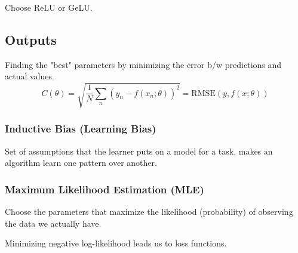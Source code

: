 \begin{warning}
    Choose ReLU or GeLU.
\end{warning}

\subsection{Outputs}
\begin{definition}
    Finding the "best" parameters by minimizing the error b/w predictions and actual values. 
    \begin{equation*}
        C(\theta) = \sqrt{\frac{1}{N} \sum_n (y_n - f(x_n; \theta))^2} = \text{RMSE}(y, f(x; \theta))
    \end{equation*}
\end{definition}

\subsubsection{Inductive Bias (Learning Bias)}
\begin{definition}
    Set of assumptions that the learner puts on a model for a task, makes an algorithm learn one pattern over another.
\end{definition}

\subsubsection{Maximum Likelihood Estimation (MLE)}
\begin{definition}
    Choose the parameters that maximize the likelihood (probability) of observing the data we actually have.
\end{definition}

\begin{warning}
    Minimizing negative log-likelihood leads us to loss functions.
\end{warning}

